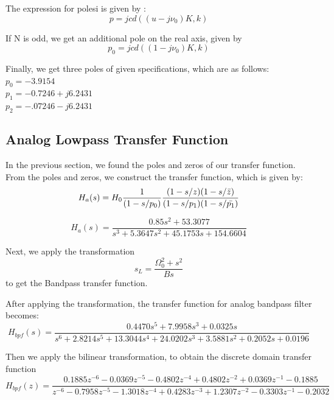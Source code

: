 \documentclass{article}
\begin{document}
The expression for polesi is given by :
\begin{equation}
    p = jcd((u-j\nu_{0})K, k)
\end{equation}

If N is odd, we get an additional pole on the real axis, given by \\
\begin{equation}
    p_{0} = jcd((1-j\nu_{0})K, k)
\end{equation}

Finally, we get three poles of given specifications, which are as follows:
$p_{0} = -3.9154$\\
$p_{1} = -0.7246 + j6.2431$\\
$p_{2} = -.07246 - j6.2431$

\subsection{Analog Lowpass Transfer Function}
In the previous section, we found the poles and zeros of our transfer function. From the poles and zeros, we construct the transfer function, which is given by:\\
\begin{equation}
    H_{a}(s) = H_{0}\frac{1}{(1-s/p_{0})} \frac{(1-s/z)(1-s/\Bar{z})}{(1-s/p_{1})(1-s/\Bar{p_{1}})}
\end{equation}

\begin{equation}
    H_{a}(s) = \frac{0.85s^{2} + 53.3077}{s^{3} + 5.3647s^{2} + 45.1753s + 154.6604}
\end{equation}

Next, we apply the transformation \[s_{L} = \frac{\Omega_{0}^2 + s^2}{Bs}\] to get the Bandpass transfer function. 

After applying the transformation, the transfer function for analog bandpass filter becomes:
\begin{equation}
    H_{bpf}(s) = \frac{0.4470s^{5}+7.9958s^{3}+0.0325s}{s^{6}+2.8214s^{5}+13.3044s^{4}+24.0202s^{3}+3.5881s^{2}+0.2052s+0.0196}
\end{equation}

Then we apply the bilinear transformation, to obtain the discrete domain transfer function
\begin{equation}
    H_{bpf}(z) = \frac{0.1885z^{-6}-0.0369z^{-5}-0.4802z^{-4}+0.4802z^{-2}+0.0369z^{-1}-0.1885}{z^{-6}-0.7958z^{-5}-1.3018z^{-4}+0.4283z^{-3}+1.2307z^{-2}-0.3303z^{-1}-0.2032}
\end{equation}
\end{document}
